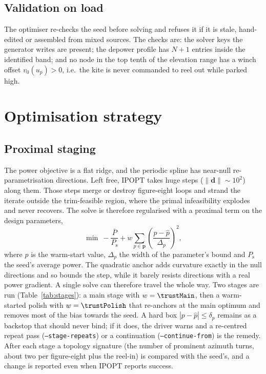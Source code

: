 \documentclass[11pt,a4paper]{article}
\newcommand{\code}[1]{\texttt{\small #1}}
\newcommand{\vect}[1]{\boldsymbol{#1}}
\begin{document}
\subsection{Validation on load}

The optimiser re-checks the seed before solving and refuses it if it is
stale, hand-edited or assembled from mixed sources. The checks are: the
solver keys the generator writes are present; the depower profile has
$N+1$ entries inside the identified band; and no node in the top tenth of
the elevation range has a winch offset $v_0(u_p)>0$, i.e.\ the kite is never
commanded to reel out while parked high.

\section{Optimisation strategy}
\label{sec:opt}

\subsection{Proximal staging}
\label{sec:staging}

The power objective is a flat ridge, and the periodic spline has near-null
re-parametrisation directions. Left free, IPOPT takes huge steps
($\|\vect d\|\sim10^2$) along them. Those steps merge or destroy figure-eight
loops and strand the iterate outside the trim-feasible region, where the
primal infeasibility explodes and never recovers. The solve is therefore
regularised with a proximal term on the design parameters,
\begin{equation}
  \min\ -\frac{\bar P}{P_\mathrm{s}} + w\sum_{p\in\vect p}\left(\frac{p-\hat p}{\Delta_p}\right)^2,
  \label{eq:proximal}
\end{equation}
where $\hat p$ is the warm-start value, $\Delta_p$ the width of the
parameter's bound and $P_\mathrm{s}$ the seed's average power. The quadratic
anchor adds curvature exactly in the null directions and so bounds the step,
while it barely resists directions with a real power gradient. A single solve
can therefore travel the whole way. Two stages are run
(Table~\ref{tab:stages}): a main stage with $w=\trustMain$, then a warm-started
polish with $w=\trustPolish$ that re-anchors at the main optimum and removes
most of the bias towards the seed. A hard box $|p-\hat p|\le\delta_p$ remains
as a backstop that should never bind; if it does, the driver warns and a
re-centred repeat pass (\code{--stage-repeats}) or a continuation
(\code{--continue-from}) is the remedy. After each stage a topology signature
(the number of prominent azimuth turns, about two per figure-eight plus the
reel-in) is compared with the seed's, and a change is reported even when
IPOPT reports success.
\end{document}
